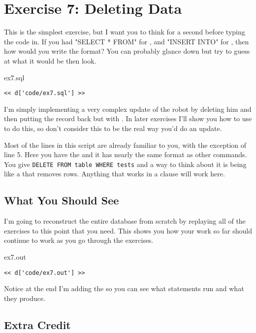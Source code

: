 \chapter{Exercise 7: Deleting Data}

This is the simplest exercise, but I want you to think for a second before
typing the code in.  If you had "SELECT * FROM" for , and
"INSERT INTO" for , then how would you write the 
format?  You can probably glance down but try to guess at what it would
be then look.

\begin{code}{ex7.sql}
\begin{Verbatim}
<< d['code/ex7.sql'] >>
\end{Verbatim}
\end{code}

I'm simply implementing a very complex update of the robot by deleting 
him and then putting the record back but with .  In later
exercises I'll show you how to use  to do this, so don't
consider this to be the real way you'd do an update.

Most of the lines in this script are already familiar to you, with the
exception of line 5.  Here you have the  and it has
nearly the same format as other commands.  You give \verb|DELETE FROM table WHERE tests| and a way to think about it is being like a  that
removes rows.  Anything that works in a  clause will work here.

\section{What You Should See}

I'm going to reconstruct the entire database from scratch by replaying all of
the exercises to this point that you need.  This shows you how your work 
so far should continue to work as you go through the exercises.

\begin{code}{ex7.out}
\begin{Verbatim}
<< d['code/ex7.out'] >>
\end{Verbatim}
\end{code}

Notice at the end I'm adding the  so you can see
what statements run and what they produce.

\section{Extra Credit}

